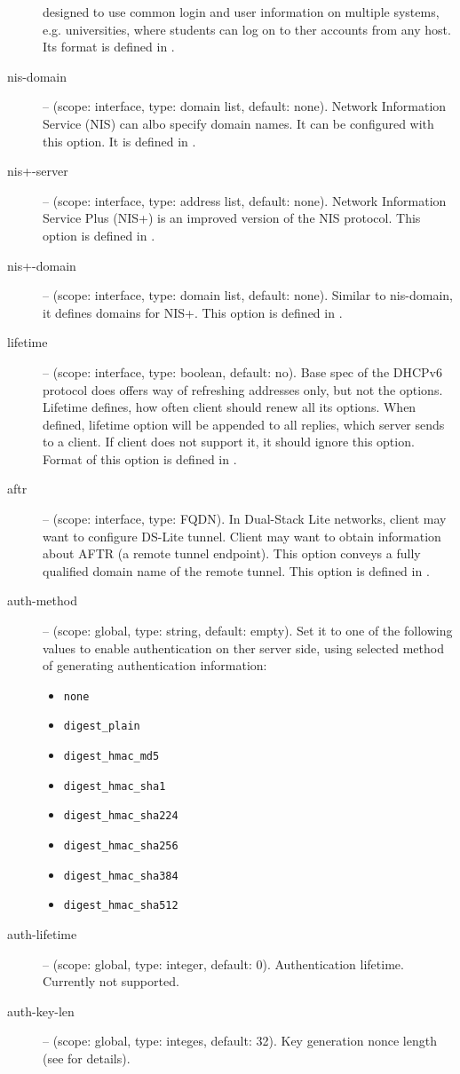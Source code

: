 \begin{description}
   designed to use common login and user information on multiple
   systems, e.g. universities, where students can log on to ther
   accounts from any host. Its format is defined in \cite{rfc3898}.
 \item[nis-domain] -- (scope: interface, type: domain list, default:
   none). Network Information Service (NIS) can albo specify domain
   names. It can be configured with this option. It is defined in
   \cite{rfc3898}.
 \item[nis+-server] -- (scope: interface, type: address list, default:
   none). Network Information Service Plus (NIS+) is an improved
   version of the NIS protocol. This option is defined in
   \cite{rfc3898}.
 \item[nis+-domain] -- (scope: interface, type: domain list, default:
   none). Similar to nis-domain, it defines domains for NIS+. This
   option is defined in \cite{rfc3898}.
 \item[lifetime] -- (scope: interface, type: boolean, default:
   no). Base spec of the DHCPv6 protocol does offers way of refreshing
   addresses only, but not the options. Lifetime defines, how often
   client should renew all its options. When defined, lifetime option
   will be appended to all replies, which server sends to a client. If
   client does not support it, it should ignore this option. Format of
   this option is defined in \cite{rfc4242}.
 \item[aftr] -- (scope: interface, type: FQDN). In Dual-Stack Lite
   networks, client may want to configure DS-Lite tunnel. Client may
   want to obtain information about AFTR (a remote tunnel
   endpoint). This option conveys a fully qualified domain name of the
   remote tunnel. This option is defined in \cite{rfc6334}.
 \item[auth-method] -- (scope: global, type: string, default:
   empty). Set it to one of the following values to enable
   authentication on ther server side, using selected method of
   generating authentication information:
   \begin{itemize}
   \item \texttt{none}
   \item \texttt{digest\_plain}
   \item \texttt{digest\_hmac\_md5}
   \item \texttt{digest\_hmac\_sha1}
   \item \texttt{digest\_hmac\_sha224}
   \item \texttt{digest\_hmac\_sha256}
   \item \texttt{digest\_hmac\_sha384}
   \item \texttt{digest\_hmac\_sha512}
   \end{itemize}
 \item[auth-lifetime] -- (scope: global, type: integer, default:
   0). Authentication lifetime. Currently not supported.
 \item[auth-key-len] -- (scope: global, type: integes, default:
   32). Key generation nonce length (see \cite{draft-aaa} for
   details).
\end{description}


